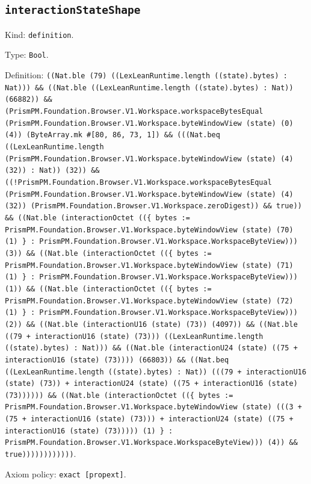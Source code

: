 \documentclass[11pt]{article}
\begin{document}
\subsection*{\texttt{interactionStateShape}}
\noindent Kind: \texttt{definition}.\par
\noindent Type: \texttt{Bool}.\par
\noindent Definition: \texttt{((Nat.ble (79) ((LexLeanRuntime.length ((state).bytes) : Nat))) \&\& ((Nat.ble ((LexLeanRuntime.length ((state).bytes) : Nat)) (66882)) \&\& (PrismPM.Foundation.Browser.V1.Workspace.workspaceBytesEqual (PrismPM.Foundation.Browser.V1.Workspace.byteWindowView (state) (0) (4)) (ByteArray.mk \#[80, 86, 73, 1]) \&\& (((Nat.beq ((LexLeanRuntime.length (PrismPM.Foundation.Browser.V1.Workspace.byteWindowView (state) (4) (32)) : Nat)) (32)) \&\& ((!PrismPM.Foundation.Browser.V1.Workspace.workspaceBytesEqual (PrismPM.Foundation.Browser.V1.Workspace.byteWindowView (state) (4) (32)) (PrismPM.Foundation.Browser.V1.Workspace.zeroDigest)) \&\& true)) \&\& ((Nat.ble (interactionOctet ((\{ bytes := PrismPM.Foundation.Browser.V1.Workspace.byteWindowView (state) (70) (1) \} : PrismPM.Foundation.Browser.V1.Workspace.WorkspaceByteView))) (3)) \&\& ((Nat.ble (interactionOctet ((\{ bytes := PrismPM.Foundation.Browser.V1.Workspace.byteWindowView (state) (71) (1) \} : PrismPM.Foundation.Browser.V1.Workspace.WorkspaceByteView))) (1)) \&\& ((Nat.ble (interactionOctet ((\{ bytes := PrismPM.Foundation.Browser.V1.Workspace.byteWindowView (state) (72) (1) \} : PrismPM.Foundation.Browser.V1.Workspace.WorkspaceByteView))) (2)) \&\& ((Nat.ble (interactionU16 (state) (73)) (4097)) \&\& ((Nat.ble ((79 + interactionU16 (state) (73))) ((LexLeanRuntime.length ((state).bytes) : Nat))) \&\& ((Nat.ble (interactionU24 (state) ((75 + interactionU16 (state) (73)))) (66803)) \&\& ((Nat.beq ((LexLeanRuntime.length ((state).bytes) : Nat)) (((79 + interactionU16 (state) (73)) + interactionU24 (state) ((75 + interactionU16 (state) (73)))))) \&\& ((Nat.ble (interactionOctet ((\{ bytes := PrismPM.Foundation.Browser.V1.Workspace.byteWindowView (state) (((3 + (75 + interactionU16 (state) (73))) + interactionU24 (state) ((75 + interactionU16 (state) (73))))) (1) \} : PrismPM.Foundation.Browser.V1.Workspace.WorkspaceByteView))) (4)) \&\& true))))))))))))}.\par
\noindent Axiom policy: \texttt{exact [propext]}.\par
\end{document}
